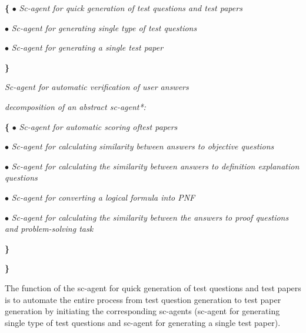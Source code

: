 \documentclass{article}
\begin{document}
\begin{multicols}{2}
\begin{description}[ labelwidth=0.75cm]
\begin{description}[ labelwidth=1.2cm, itemsep=-1.5mm]
\leftskip=0.62cm \textbf{\{} $\bullet$ 
\hspace{7mm} \textit{Sc-agent for quick generation of test questions and test papers}

\leftskip=1cm $\bullet$ 
\hspace{7mm} \textit{Sc-agent for generating single type of test questions}

\leftskip=1cm $\bullet$ 
\hspace{7mm} \textit{Sc-agent for generating a single test paper}

\leftskip=0.7cm \textbf{\}}

\end{description}
\begin{description}[ labelwidth=0.9cm]
\item[$\bullet$]
\noindent \leftskip=0.7cm \textit{Sc-agent for automatic verification of user answers}

\vspace{-0.2cm}
\leftskip=0.35cm
\item[$\Leftarrow$] \textit{decomposition of an abstract sc-agent*:}

\end{description}

\leftskip=1.4cm \textbf{\{} $\bullet$ 
\hspace{7mm} \textit{Sc-agent for automatic scoring oftest papers}

\leftskip=1.7cm $\bullet$ 
\hspace{7mm} \textit{Sc-agent for calculating similarity between answers to objective questions}

\leftskip=1.7cm $\bullet$ 
\hspace{7mm} \textit{Sc-agent for calculating the similarity between answers to definition explanation questions}

\leftskip=1.7cm $\bullet$ 
\hspace{7mm} \textit{Sc-agent for converting a logical formula into PNF}

\leftskip=1.7cm $\bullet$ 
\hspace{7mm} \textit{Sc-agent for calculating the similarity between the answers to proof questions and problem-solving task}

\leftskip=1.4cm \textbf{\}}
\end{description}

\leftskip=0.8cm\textbf{\}}

\leftskip=0cm
The function of the sc-agent for quick generation of test questions and test papers is to automate the entire process from test question generation to test paper generation by initiating the corresponding sc-agents (sc-agent for generating single type of test questions and sc-agent for generating a single test paper).


\end{multicols}
\end{document}
